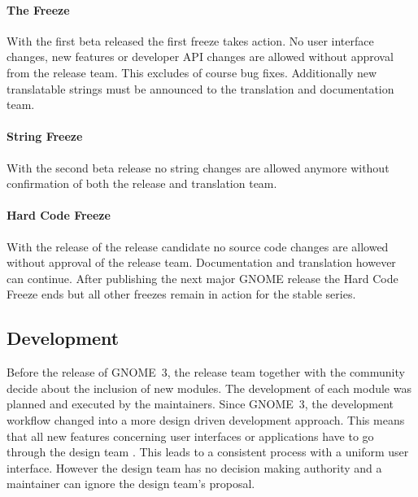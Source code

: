 \paragraph{The Freeze}

With the first beta released the first freeze takes action. No user interface
changes, new features or developer \ac{API} changes are allowed without
approval from the release team. This excludes of course bug fixes. Additionally
new translatable strings must be announced to the translation and documentation
team.

\paragraph{String Freeze}

With the second beta release no string changes are allowed anymore without
confirmation of both the release and translation team.

\paragraph{Hard Code Freeze}

With the release of the release candidate no source code changes are allowed
without approval of the release team. Documentation and translation however can
continue. After publishing the next major GNOME release the Hard Code Freeze
ends but all other freezes remain in action for the stable series.


\subsection{Development} %

Before the release of GNOME~3, the release team together with the community
decide about the inclusion of new modules. The development of each module was
planned and executed by the maintainers. Since GNOME~3, the development
workflow changed into a more design driven development approach. This means
that all new features concerning user interfaces or applications have to go
through the design team \cite{GNOMEDesignTeam}. This leads to a consistent
process with a uniform user interface. However the design team has no decision
making authority and a maintainer can ignore the design team's proposal.

